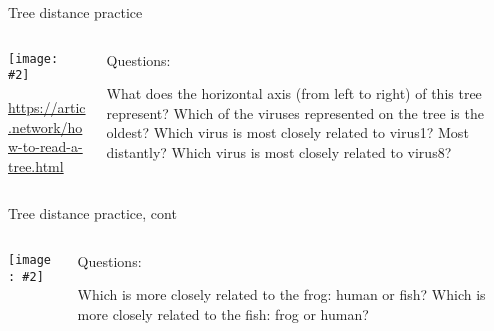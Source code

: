 \documentclass{beamer}
\renewcommand{\c}[1]{\begin{center}#1\end{center}}
\newcommand{\gr}[2][.95]{\c{\texttt{[image: \#2]}}}
\begin{document}
\begin{frame}{Tree distance practice}
    \begin{columns}
        \begin{column}{0.5\textwidth}
            \gr{l5_figs/s8_viral_tree.png}
            \tiny \url{https://artic.network/how-to-read-a-tree.html}
        \end{column}
        \begin{column}{0.5\textwidth}
            Questions:
            \begin{outline}
                \1 What does the horizontal axis (from left to right) of this tree represent?
                \1 Which of the viruses represented on the tree is the oldest?
                \1 Which virus is most closely related to virus1? Most distantly?
                \1 Which virus is most closely related to virus8?
            \end{outline}
        \end{column}
    \end{columns}
\end{frame}

\begin{frame}{Tree distance practice, cont}
    \begin{columns}
        \begin{column}{0.5\textwidth}
            \gr[0.8]{l5_figs/s9_2trees.png}
        \end{column}
        \begin{column}{0.5\textwidth}
            Questions:
            \begin{outline}
                \1 Which is more closely related to the frog: human or fish?
                \1 Which is more closely related to the fish: frog or human?
            \end{outline}
        \end{column}
    \end{columns}
\end{frame}
\end{document}
